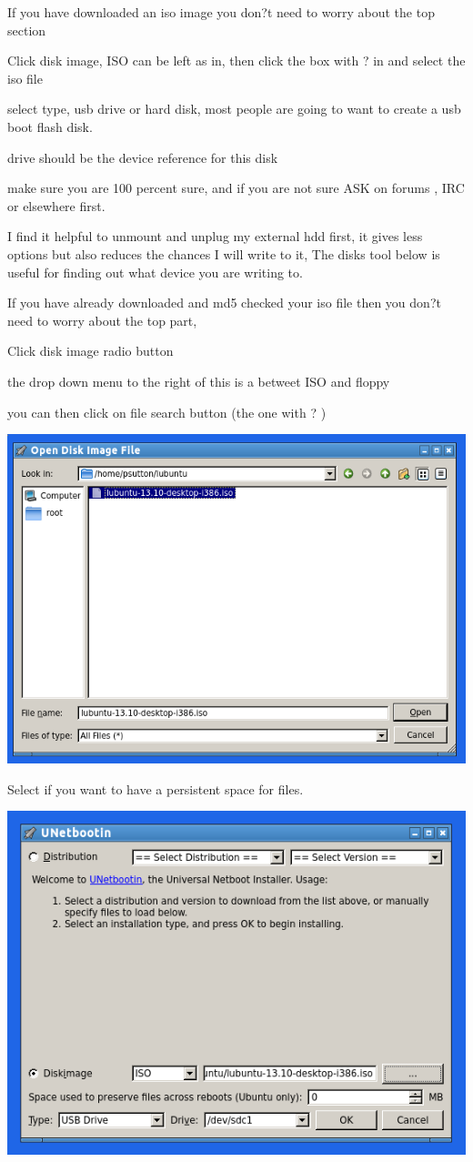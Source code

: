 \documentclass[12pt,a4paper]{book}
\begin{document}
If you have downloaded an iso image  you don?t need to worry about the top section

Click disk image,  ISO can be left as in,  then click the box with ? in and select the iso file

select type, usb drive or hard disk,  most people are going to want to create a usb boot flash disk.

drive should be the device reference for this disk

make sure you are 100 percent sure,  and if you are not sure ASK on forums , IRC or elsewhere first.

I find it helpful to unmount and unplug my external hdd first,  it gives less options but also reduces the chances I will write to it,  The disks tool below is useful for finding out what device you are writing to.

If you have already downloaded and md5 checked your iso file then you don?t need to worry about the top part,

Click disk image radio button

the drop down menu to the right of this is a betweet ISO and floppy

you can then click on file search button (the one with ? )
\begin{center}
\includegraphics[width=0.7\linewidth]{unetbootin2} 

\end{center}



Select if you want to have a persistent space for files.


\begin{center}
\includegraphics[width=0.7\linewidth]{unetbootin3}
\end{center}
\end{document}
